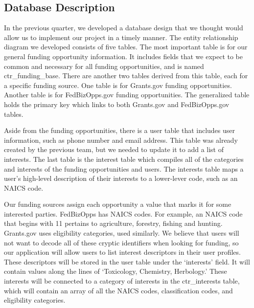 \documentclass[onecolumn]{IEEEtran}
\begin{document}
\subsection{Database Description}
In the previous quarter, we developed a database design that we thought would allow us to implement our project in a timely manner. The entity relationship diagram we developed consists of five tables. The most important table is for our general funding opportunity information. It includes fields that we expect to be common and necessary for all funding opportunities, and is named ctr\_funding\_base. There are another two tables derived from this table, each for a specific funding source. One table is for Grants.gov funding opportunities. Another table is for FedBizOpps.gov funding opportunities. The generalized table holds the primary key which links to both Grants.gov and FedBizOpps.gov tables. 

Aside from the funding opportunities, there is a user table that includes user information, such as phone number and email address. This table was already created by the previous team, but we needed to update it to add a list of interests. The last table is the interest table which compiles all of the categories and interests of the funding opportunities and users. The interests table maps a user's high-level description of their interests to a lower-lever code, such as an NAICS code.

Our funding sources assign each opportunity a value that marks it for some interested parties. FedBizOpps has NAICS codes. For example, an NAICS code that begins with 11 pertains to agriculture, forestry, fishing and hunting. Grants.gov uses eligibility categories, used similarly. We believe that users will not want to decode all of these cryptic identifiers when looking for funding, so our application will allow users to list interest descriptors in their user profiles. These descriptors will be stored in the user table under the `interests' field. It will contain values along the lines of `Toxicology, Chemistry, Herbology.' These interests will be connected to a category of interests in the ctr\_interests table, which will contain an array of all the NAICS codes, classification codes, and eligibility categories.
\end{document}
